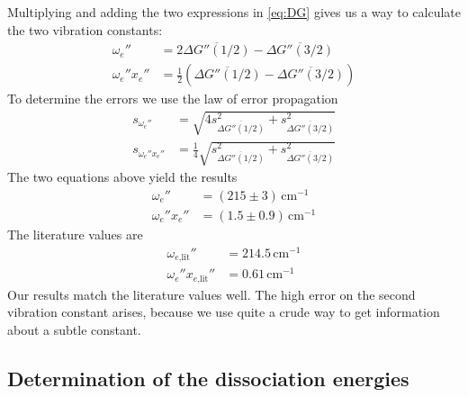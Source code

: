 Multiplying and adding the two expressions in \autoref{eq:DG}
gives us a way to calculate the two vibration constants:
\begin{equation}
\begin{split}
  \omega_e'' & =2\overline{\Delta G''(1/2)}- \overline{\Delta G''(3/2)}\\
  \omega_e''x_e'' & =\frac{1}{2}(\overline{\Delta G''(1/2)}- \overline{\Delta G''(3/2)})
  \end{split}
\end{equation}
To determine the errors we use the law of error propagation
\begin{equation}
\begin{split}
  s_{\omega_e''} & =\sqrt{4s^2_{\overline{\Delta G''(1/2)}}+ s^2_{\overline{\Delta G''(3/2)}}}\\
  s_{\omega_e''x_e''} & =\frac{1}{4}\sqrt{s^2_{\overline{\Delta G''(1/2)}}+ s^2_{\overline{\Delta G''(3/2)}}}
\end{split}
\end{equation}
The two equations above yield the results
\begin{equation}
\begin{split}
  \omega_e'' & =(215 \pm 3)\,\text{cm}^{-1}\\
  \omega_e''x_e'' & =(1.5 \pm 0.9)\,\text{cm}^{-1}
  \end{split}
\end{equation}
The literature values \cite{rank} are %
\begin{equation}
\begin{split}
  \omega_{e\text{,lit}}'' & =214.5\,\text{cm}^{-1}\\
  \omega_e''x_{e\text{,lit}}'' & =0.61\,\text{cm}^{-1}
  \end{split}
\end{equation}
Our results match the literature values well. The high error on the second vibration constant
arises, because we use quite a crude way to get information about a subtle constant.



\subsection{Determination of the dissociation energies}

